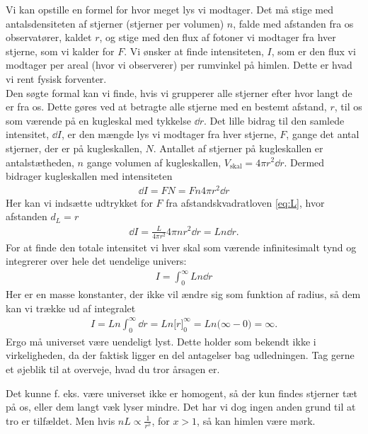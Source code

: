Vi kan opstille en formel for hvor meget lys vi modtager. Det må stige med antalsdensiteten af stjerner (stjerner per volumen) $n$, falde med afstanden fra os observatører, kaldet $r$, og stige med den flux af fotoner vi modtager fra hver stjerne, som vi kalder for $F$. Vi ønsker at finde intensiteten, $I$, som er den flux vi modtager per areal (hvor vi observerer) per rumvinkel på himlen. Dette er hvad vi rent fysisk forventer. \\

Den søgte formal kan vi finde, hvis vi grupperer alle stjerner efter hvor langt de er fra os. Dette gøres ved at betragte alle stjerne med en bestemt afstand, $r$, til os som værende på en kugleskal %
med tykkelse $\dd r$. Det lille bidrag til den samlede intensitet, $\dd{I}$, er den mængde lys vi modtager fra hver stjerne, $F$, gange det antal stjerner, der er på kugleskallen, $N$. Antallet af stjerner på kugleskallen er antalstætheden, $n$ gange volumen af kugleskallen, $V_\mathrm{skal} = 4\pi r^2 \dd r$. Dermed bidrager kugleskallen med intensiteten
\begin{align}
	\dd I = FN = Fn4\pi r^2\dd r %
\end{align}
Her kan vi indsætte udtrykket for $F$ fra afstandskvadratloven \ref{eq:L}, hvor afstanden $d_L = r$ %
\begin{align}
	\dd I = \frac{L}{4\pi r^2} 4\pi nr^2\dd r = L n \dd r. 
\end{align}
For at finde den totale intensitet vi hver skal som værende infinitesimalt tynd og integrerer over hele det uendelige univers:
\begin{align}
	I =\int^\infty_0 Ln \dd{r}
\end{align}
Her er en masse konstanter, der ikke vil ændre sig som funktion af radius, så dem kan vi trække ud af integralet
\begin{align}
	I = Ln \int^\infty_0 \dd r = L n \big[r\big]_0^\infty = L n \big(\infty - 0\big) = \infty.
\end{align}
Ergo må universet være uendeligt lyst.  Dette holder som bekendt ikke i virkeligheden, da der faktisk ligger en del antagelser bag udledningen. Tag gerne et øjeblik til at overveje, hvad du tror årsagen er.

Det kunne f. eks. være universet ikke er homogent, så der kun findes stjerner tæt på os, eller dem langt væk lyser mindre. Det har vi dog ingen anden grund til at tro er tilfældet. Men hvis $nL \propto \frac{1}{r^x}$, for $x>1$, så kan himlen være mørk.

